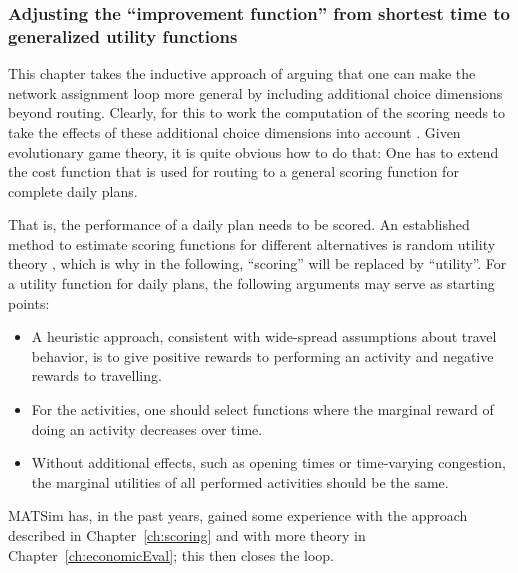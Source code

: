 


\subsubsection{Adjusting the ``improvement function'' from shortest
time to generalized utility functions}
\label{sec:adjust-impr-funct}

\def\perf{{\it perf}}


This chapter takes the inductive approach of arguing that one can make
the network assignment loop more general by including additional
choice dimensions beyond routing.  Clearly, for this to work the
computation of the scoring needs to take the effects of these
additional choice dimensions into account \citep[also
  see][]{Balmer2007phd}.  Given evolutionary game theory, it is quite
obvious how to do that: One has to extend the cost
function that is used for routing to a general scoring function for
complete daily plans.


That is, the performance of a daily plan needs to be scored.  An
established method to estimate scoring functions for different
alternatives is random utility theory \citep[e.g.][]{ben-akiva-1985},
which is why in the following, ``scoring'' will be replaced by
``utility''.  For a utility function for daily plans, the following
arguments may serve as starting points:
\begin{itemize}

\item A heuristic approach, consistent with wide-spread assumptions
  about travel behavior, is to give positive rewards to performing an
  activity and negative rewards to travelling.

\item For the activities, one should select functions where the
  marginal reward of doing an activity decreases over time.

\item Without additional effects, such as opening times or
  time-varying congestion, the marginal utilities of all performed
  activities should be the same.  

\end{itemize}
MATSim has, in the past years, gained some experience with the approach 
described in Chapter~\ref{ch:scoring} and with more theory in 
Chapter~\ref{ch:economicEval}; this then closes the loop.  


